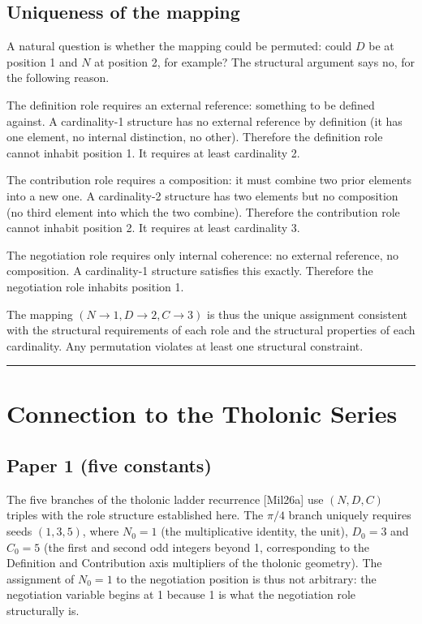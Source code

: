 \documentclass[12pt]{article}
\begin{document}
\subsection{Uniqueness of the mapping}\label{uniqueness-of-the-mapping}

A natural question is whether the mapping could be permuted: could \(D\)
be at position 1 and \(N\) at position 2, for example? The structural
argument says no, for the following reason.

The definition role requires an external reference: something to be
defined against. A cardinality-1 structure has no external reference by
definition (it has one element, no internal distinction, no other).
Therefore the definition role cannot inhabit position 1. It requires at
least cardinality 2.

The contribution role requires a composition: it must combine two prior
elements into a new one. A cardinality-2 structure has two elements but
no composition (no third element into which the two combine). Therefore
the contribution role cannot inhabit position 2. It requires at least
cardinality 3.

The negotiation role requires only internal coherence: no external
reference, no composition. A cardinality-1 structure satisfies this
exactly. Therefore the negotiation role inhabits position 1.

The mapping \((N \to 1, D \to 2, C \to 3)\) is thus the unique
assignment consistent with the structural requirements of each role and
the structural properties of each cardinality. Any permutation violates
at least one structural constraint.

\begin{center}\rule{0.5\linewidth}{0.5pt}\end{center}

\section{Connection to the Tholonic Series}\label{connection-to-the-tholonic-series}

\subsection{Paper 1 (five constants)}\label{paper-1-five-constants}

The five branches of the tholonic ladder recurrence {[}Mil26a{]} use
\((N, D, C)\) triples with the role structure established here. The
\(\pi/4\) branch uniquely requires seeds \((1, 3, 5)\), where
\(N_0 = 1\) (the multiplicative identity, the unit), \(D_0 = 3\) and
\(C_0 = 5\) (the first and second odd integers beyond 1, corresponding
to the Definition and Contribution axis multipliers of the tholonic
geometry). The assignment of \(N_0 = 1\) to the negotiation position is
thus not arbitrary: the negotiation variable begins at 1 because 1 is
what the negotiation role structurally is.
\end{document}
